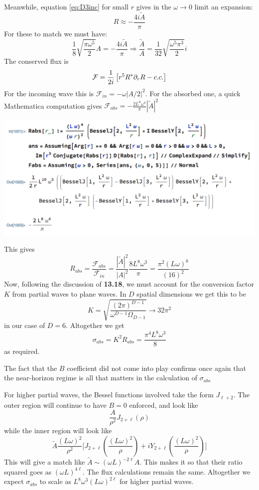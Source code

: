 \documentclass[11pt, class=article, crop=false]{standalone}
\begin{document}
\begin{enumerate}
	Meanwhile, equation \eqref{eq:D3inc} for small $r$ gives in the $\omega \to 0$ limit an expansion: 
	\[
		R \approx - \frac{4 i \tilde A}{\pi}
	\]
	For these to match we must have:
	\[
		\frac18 \sqrt{\frac{\pi \omega^5}{2}} A = - \frac{4 i \tilde A}{\pi} \Rightarrow \frac{\tilde A}{A} = \frac{1}{32} \sqrt{\frac{\omega^5 \pi^3}{2}} i
	\]
	The conserved flux is 
	\[
		\mathcal F = \frac{1}{2 i} \left[r^5 R^* \partial_r R - c.c. \right] 
	\]
	For the incoming wave this is $\mathcal F_{in} = -\omega |A/2|^2$. For the absorbed one, a quick Mathematica computation gives
	 $\mathcal F_{abs} = -\frac{2 L^8 \omega^4}{\pi} |\tilde A|^2$
\begin{center}
	\includegraphics[scale=0.5]{"Figures/Rabs"}
\end{center}
	This gives
	\[
		R_{abs} = \frac{\mathcal F_{abs}}{\mathcal F_{in}} = \frac{|\tilde A|^2}{|A|^2} \frac{8 L^8 \omega^3}{\pi} = \frac{\pi^2 (L \omega)^8}{(16)^2}
	\]
	Now, following the discussion of \textbf{13.18}, we must account for  the conversion factor $K$ from partial waves to plane waves. In $D$ spatial dimensions we get this to be
	\[
		K = \sqrt{\frac{(2\pi)^{D-1}}{\omega^{D-1} \Omega_{D-1}}} \to 32 \pi^2
	\]
	in our case of $D = 6$. Altogether we get
	\[
		\sigma_{abs} = K^2 R_{abs} = \frac{\pi^4 L^8 \omega^3}{8}
	\]
	as required.
	
	The fact that the $B$ coefficient did not come into play confirms once again that the near-horizon regime is all that matters in the calculation of $\sigma_{abs}$
	
	For higher partial waves, the Bessel functions involved take the form $J_{\ell+2}$. The outer region will continue to have $B = 0$ enforced, and look like
	\[
		\frac{A}{\rho^2} J_{2 + \ell}(\rho)
	\]
	while the inner region will look like
	\[
		\tilde A \frac{(L \omega)^2}{\rho^2} \Big[ J_{2+\ell}(\frac{(L \omega)^2}{\rho})+ i Y_{2+\ell}(\frac{(L \omega)^2}{\rho}) \Big]
	\]
	This will give a match like $\tilde A \sim (\omega L)^{-2 \ell} A$. This makes it so that their ratio squared goes as $(\omega L)^{4 \ell}$. The flux calculations remain the same. Altogether we expect $\sigma_{abs}$ to scale as $L^8 \omega^3 (L \omega)^{2\ell}$ for higher partial waves.
	

\end{enumerate}
\end{document}
